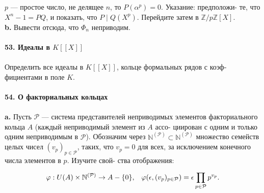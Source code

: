 $p$ — простое число, не делящее $n$, то $P (\alpha^p)=0$. Указание: предположи-\linebreak
те, что $X^n -1=PQ$, и показать, что $P\;|\;Q(X^p)$. Перейдите затем в\linebreak
$\mathbb{Z}/p\mathbb{Z}[X]$.\\
\hspace*{10pt}\textbf{b.} Вывести отсюда, что $\Phi_n$ неприводим.
\\
\\
\noindent\textbf{53. Идеалы в $K[[X]]$}\\\\
\hspace*{10pt} Определить все идеалы в $K[[X]]$, кольце формальных рядов с коэф-\linebreak
фициентами в поле $K$.
\\
\\
\noindent\textbf{54. О факториальных кольцах}\\\\
\hspace*{10pt}\textbf{a.} Пусть $\mathcal{P}$ — система представителей неприводимых элементов\linebreak
факториального кольца $A$ (каждый неприводимый элемент из $A$ ассо-\linebreak
циирован с одним и только одним неприводимым в $\mathcal{P}$). Обозначим через\linebreak
$\mathbb{N}^{(\mathcal{P})}\subset \mathbb{N}^{(\mathcal{P})}$ множество семейств целых чисел $(v_p)_{p\in\mathcal{P}}$, таких, что $v_p= 0$\linebreak
для всех, за исключением конечного числа элементов в $p$. Изучите свой-\linebreak
ства отображения:
\begin{equation*}
\varphi: U(A)\times \mathbb{N}^{(\mathcal{P})}\rightarrow A-\{0\},\;\;\;\varphi(\epsilon,(v_p)_{p\in \mathcal{P}})=\epsilon\prod_{p\in \mathcal{P}}^ {}p^{v_p}.\pagebreak
\end{equation*}



